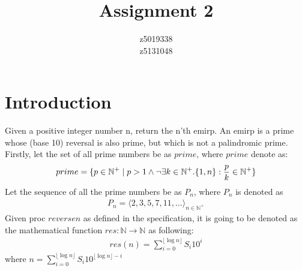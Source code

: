 \documentclass[headings=small,a4paper,12pt]{scrartcl}
\title{Assignment 2}
\author{z5019338\\z5131048}
\newcommand{\mylist}[1]{\langle #1\rangle}
\newcommand{\myfloor}[1]{\lfloor #1\rfloor}
\begin{document}
\maketitle

\section{Introduction}
\label{sec:introduction}

Given a positive integer number n, return the n'th emirp. An emirp is a prime whose (base 10) reversal is also prime, but which is not a palindromic prime.\\
Firstly, let the set of all prime numbers be as $prime$, where $prime$ denote as:
\begin{gather*}
	prime = \{p\in \mathbb{N^+}\mid p>1\wedge \neg\exists k\in \mathbb{N^+}. \{1,n\}:\frac{p}{k}\in \mathbb{N^+}\}
\end{gather*}
Let the sequence of all the prime numbers be as $P_n$, where $P_n$ is denoted as \\
\begin{gather*}
  P_n = \mylist{2,3,5,7,11,...}_{n \in \mathbb{N^+}} 
\end{gather*}
Given proc $reversen$ as defined in the specification, it is going to be denoted as the mathematical function $res:\mathbb{N} \rightarrow \mathbb{N}$ as following:
\begin{gather*}
  res(n) = \sum_{i=0}^{\myfloor{\log n}} S_i10^i 
\end{gather*}
where $n =\sum_{i=0}^{\myfloor{\log n}} S_i10^{\myfloor{\log n}-i}$
\end{document}
